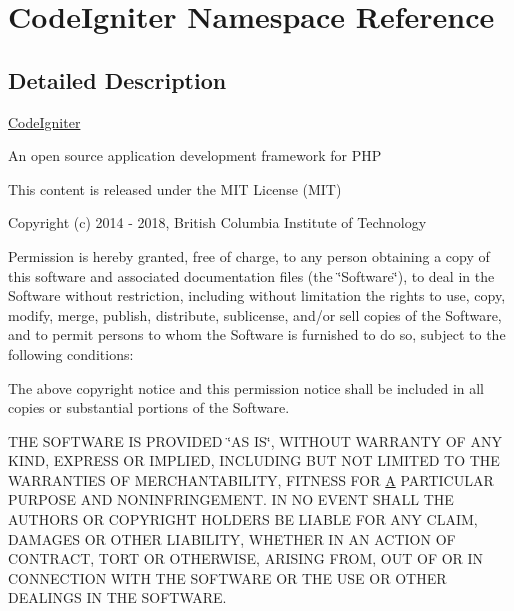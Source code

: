 \hypertarget{namespace_code_igniter}{}\section{Code\+Igniter Namespace Reference}
\label{namespace_code_igniter}


\subsection{Detailed Description}
\mbox{\hyperlink{namespace_code_igniter}{Code\+Igniter}}

An open source application development framework for P\+HP

This content is released under the M\+IT License (M\+IT)

Copyright (c) 2014 -\/ 2018, British Columbia Institute of Technology

Permission is hereby granted, free of charge, to any person obtaining a copy of this software and associated documentation files (the \char`\"{}\+Software\char`\"{}), to deal in the Software without restriction, including without limitation the rights to use, copy, modify, merge, publish, distribute, sublicense, and/or sell copies of the Software, and to permit persons to whom the Software is furnished to do so, subject to the following conditions\+:

The above copyright notice and this permission notice shall be included in all copies or substantial portions of the Software.

T\+HE S\+O\+F\+T\+W\+A\+RE IS P\+R\+O\+V\+I\+D\+ED \char`\"{}\+A\+S I\+S\char`\"{}, W\+I\+T\+H\+O\+UT W\+A\+R\+R\+A\+N\+TY OF A\+NY K\+I\+ND, E\+X\+P\+R\+E\+SS OR I\+M\+P\+L\+I\+ED, I\+N\+C\+L\+U\+D\+I\+NG B\+UT N\+OT L\+I\+M\+I\+T\+ED TO T\+HE W\+A\+R\+R\+A\+N\+T\+I\+ES OF M\+E\+R\+C\+H\+A\+N\+T\+A\+B\+I\+L\+I\+TY, F\+I\+T\+N\+E\+SS F\+OR \mbox{\hyperlink{class_a}{A}} P\+A\+R\+T\+I\+C\+U\+L\+AR P\+U\+R\+P\+O\+SE A\+ND N\+O\+N\+I\+N\+F\+R\+I\+N\+G\+E\+M\+E\+NT. IN NO E\+V\+E\+NT S\+H\+A\+LL T\+HE A\+U\+T\+H\+O\+RS OR C\+O\+P\+Y\+R\+I\+G\+HT H\+O\+L\+D\+E\+RS BE L\+I\+A\+B\+LE F\+OR A\+NY C\+L\+A\+IM, D\+A\+M\+A\+G\+ES OR O\+T\+H\+ER L\+I\+A\+B\+I\+L\+I\+TY, W\+H\+E\+T\+H\+ER IN AN A\+C\+T\+I\+ON OF C\+O\+N\+T\+R\+A\+CT, T\+O\+RT OR O\+T\+H\+E\+R\+W\+I\+SE, A\+R\+I\+S\+I\+NG F\+R\+OM, O\+UT OF OR IN C\+O\+N\+N\+E\+C\+T\+I\+ON W\+I\+TH T\+HE S\+O\+F\+T\+W\+A\+RE OR T\+HE U\+SE OR O\+T\+H\+ER D\+E\+A\+L\+I\+N\+GS IN T\+HE S\+O\+F\+T\+W\+A\+RE.

